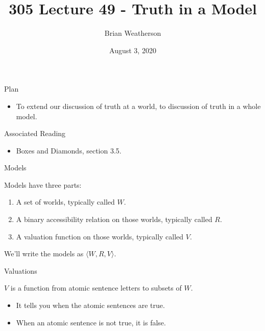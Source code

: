 \documentclass[
  ignorenonframetext,
]{beamer}
\title{305 Lecture 49 - Truth in a Model}
\author{Brian Weatherson}
\date{August 3, 2020}
\providecommand{\tightlist}{%
  \setlength{\itemsep}{0pt}\setlength{\parskip}{0pt}}
\renewcommand{\,}{\text{, }}
\begin{document}
\frame{\titlepage}

\begin{frame}{Plan}
\protect\hypertarget{plan}{}

\begin{itemize}
\tightlist
\item
  To extend our discussion of truth at a world, to discussion of truth
  in a whole model.
\end{itemize}

\end{frame}

\begin{frame}{Associated Reading}
\protect\hypertarget{associated-reading}{}

\begin{itemize}
\tightlist
\item
  Boxes and Diamonds, section 3.5.
\end{itemize}

\end{frame}

\begin{frame}{Models}
\protect\hypertarget{models}{}

Models have three parts:

\begin{enumerate}
\tightlist
\item
  A set of worlds, typically called \(W\). \pause
\item
  A binary accessibility relation on those worlds, typically called
  \(R\). \pause
\item
  A valuation function on those worlds, typically called \(V\). \pause
\end{enumerate}

We'll write the models as \(\langle W, R, V\rangle\).

\end{frame}

\begin{frame}{Valuations}
\protect\hypertarget{valuations}{}

\(V\) is a function from atomic sentence letters to subsets of \(W\).

\begin{itemize}
\tightlist
\item
  It tells you when the atomic sentences are true.
\item
  When an atomic sentence is not true, it is false.
\end{itemize}

\end{frame}
\end{document}
